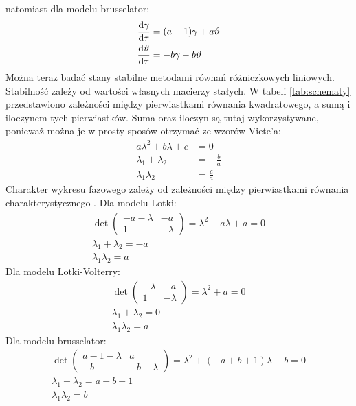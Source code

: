 \documentclass[10pt, a4paper, twoside, onecolumn]{article}
\numberwithin{equation}{section}
\begin{document}
	natomiast dla modelu brusselator:
	\begin{equation}\label{bruskelator_lin}
	\begin{split}
		\dv{\gamma}{\tau} &= (a-1)\gamma+a\vartheta \\
		\dv{\vartheta}{\tau} &= -b\gamma-b\vartheta
	\end{split}
	\end{equation}
	Można teraz badać stany stabilne metodami równań różniczkowych liniowych. Stabilność zależy od wartości własnych macierzy stałych. W tabeli \ref{tab:schematy} przedstawiono zależności między pierwiastkami równania kwadratowego, a sumą i iloczynem tych pierwiastków. Suma oraz iloczyn są tutaj wykorzystywane, ponieważ można je w prosty sposów otrzymać ze wzorów Viete'a: 
	\begin{equation}
		\begin{split}
			a\lambda^{2} + b\lambda + c &= 0 \\
			\lambda_{1} + \lambda_{2} &= -\frac{b}{a} \\
			\lambda_{1}\lambda_{2} &= \frac{c}{a}
		\end{split}
	\end{equation}
	Charakter wykresu fazowego zależy od zależności między pierwiastkami równania charakterystycznego \cite{orlik}.
	Dla modelu Lotki:
	\begin{equation}\label{lotka_charakterystyczne}
	\begin{split}
		\det
		\begin{pmatrix}
			-a-\lambda & -a \\
			1 & -\lambda
		\end{pmatrix}
		=\lambda^{2}+a\lambda+a=0 \\
		\lambda_{1}+\lambda_{2}=-a \\
		\lambda_{1}\lambda_{2}=a
	\end{split}
	\end{equation}
	Dla modelu Lotki-Volterry:
	\begin{equation}\label{lotka_volterra_charakterystyczne}
	\begin{split}
		\det
		\begin{pmatrix}
			-\lambda & -a \\
			1 & -\lambda
		\end{pmatrix}
		=\lambda^{2}+a=0 \\
		\lambda_{1}+\lambda_{2}=0 \\
		\lambda_{1}\lambda_{2}=a
	\end{split}
	\end{equation}
	Dla modelu brusselator:
	\begin{equation}\label{bruskelator_charakterystyczne}
	\begin{split}
		\det
		\begin{pmatrix}
			a-1-\lambda & a \\
			-b & -b-\lambda
		\end{pmatrix}
		=\lambda^{2}+(-a+b+1)\lambda+b=0 \\
		\lambda_{1}+\lambda_{2}=a-b-1 \\
		\lambda_{1}\lambda_{2}=b
	\end{split}
	\end{equation}
	
\end{document}
